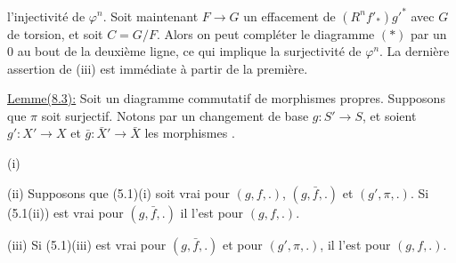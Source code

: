 l'injectivité de $\varphi^n$. Soit maintenant $F\longrightarrow G$ un effacement de $(R^nf'_*)g'^*$ avec $G$ de torsion, et soit $C=G/F$. Alors on peut compléter le diagramme $(*)$ par un $0$ au bout de la deuxième ligne, ce qui implique la surjectivité de $\varphi^n$. La dernière assertion de (iii) est immédiate à partir de la première.

\uline{Lemme(8.3):} Soit
un diagramme commutatif de morphismes propres. Supposons que $\pi$ soit surjectif. Notons par un  changement de base $g:S'\longrightarrow S$, et soient $g':X'\longrightarrow X$ et $\bar g:\bar X'\longrightarrow\bar X$ les morphismes .

(i)  

(ii) Supposons que (5.1)(i) soit vrai pour $(g,f,.)$, $(g,\bar f,.)$ et $(g',\pi,.)$. Si (5.1(ii)) est vrai pour $(g,\bar f,.)$  il l'est pour $(g,f,.)$.

(iii) Si (5.1)(iii) est vrai pour $(g,\bar f,.)$ et pour $(g',\pi,.)$, il l'est pour $(g,f,.)$.

